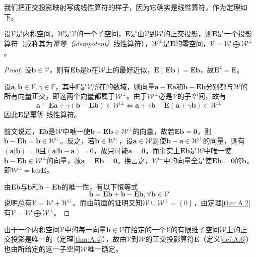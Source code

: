 \documentclass[main.tex]{subfiles}
\begin{document}
我们把正交投影映射写成线性算符的样子，因为它确实是线性算符，作为定理如下。
\begin{theorem}\label{thm:A.5}
    设$\mathcal{V}$是内积空间，$\mathcal{W}$是$\mathcal{V}$的一个子空间，$\mathbf{E}$是由$\mathcal{V}$到$\mathcal{W}$的正交投影，则$\mathbf{E}$是一个投影算符（或称其为\emph{幂等（idempotent）}线性算符），$\mathcal{W}^\perp$是$\mathbf{E}$的零空间，$\mathcal{V}=\mathcal{W}\bigoplus\mathcal{W}^\perp$。
\end{theorem}
\begin{proof}
    设$\mathbf{b}\in\mathcal{V}$，则有$\mathbf{Eb}$是$\mathbf{b}$在$\mathcal{W}$上的最好近似，$\mathbf{E}\left(\mathbf{Eb}\right)=\mathbf{Eb}$，故$\mathbf{E}^2=\mathbf{E}$。

    设$\mathbf{a},\mathbf{b}\in\mathcal{V},\gamma\in\mathbb{F}$，其中$\mathbb{F}$是$\mathcal{V}$所在的数域，则向量$\mathbf{a}-\mathbf{Ea}$和$\mathbf{b}-\mathbf{Eb}$分别都与$\mathcal{W}$的所有向量正交，即这两个向量都属于$\mathcal{W}^\perp$。由于$\mathcal{W}^\perp$必是$\mathcal{V}$的子空间，故有
    \[
        \mathbf{a}-\mathbf{Ea}+\gamma\left(\mathbf{b}-\mathbf{Eb}\right)\in\mathcal{W}^\perp\Leftrightarrow\mathbf{a}+\gamma\mathbf{b}-\mathbf{E}\left(\mathbf{a}+\gamma\mathbf{b}\right)\in\mathcal{W}^\perp
    \]
    因此$\mathbf{E}$是幂等  线性算符。

    前文说过，$\mathbf{Eb}$是$\mathcal{W}$中唯一使$\mathbf{b}-\mathbf{Eb}\in\mathcal{W}^\perp$的向量，故若$\mathbf{Eb}=\mathbf{0}$，则$\mathbf{b}-\mathbf{Eb}=\mathbf{b}\in\mathcal{W}^\perp$。反之，若$\mathbf{b}\in\mathcal{W}^\perp$，设$\mathbf{a}\in\mathcal{W}$是使$\mathbf{b}-\mathbf{a}\in\mathcal{W}^\perp$的向量，则有$\left(\mathbf{a}|\mathbf{b}\right)=0$且$\left(\mathbf{a}|\mathbf{b}-\mathbf{a}\right)=0$，故只可能$\mathbf{a}=\mathbf{0}$。而事实上$\mathbf{Eb}$是$\mathcal{W}$中唯一使$\mathbf{b}-\mathbf{Eb}\in\mathcal{W}^\perp$的向量，故$\mathbf{a}=\mathbf{Eb}=\mathbf{0}$。换言之，$\mathcal{W}^\perp$中的向量全是使$\mathbf{Eb}=\mathbf{0}$的$\mathbf{b}$，即$\mathcal{W}^\perp=\mathrm{ker}\mathbf{E}$。


    由$\mathbf{Eb}$与$\mathbf{b}$和$\mathbf{b}-\mathbf{Eb}$的唯一性，有以下恒等式
    \[\mathbf{b}=\mathbf{Eb}+\mathbf{b}-\mathbf{Eb}, \forall\mathbf{b}\in\mathcal{V}\]
    说明总有$\mathcal{V}=\mathcal{W}+\mathcal{W}^\perp$。而由前面的证明又知$\mathcal{W}\cup\mathcal{W}^\perp=\left\{0\right\}$，由定理\ref{thm:A.2}有$\mathcal{V}=\mathcal{W}\bigoplus\mathcal{W}^\perp$。
\end{proof}

由于一个内积空间$\mathcal{V}$中的每一向量$\mathbf{b}\in\mathcal{V}$在给定的一个$\mathcal{V}$的有限维子空间$\mathcal{W}$上的正交投影是唯一的（定理\ref{thm:A.4}），故由$\mathcal{V}$到$\mathcal{W}$的正交投影算符$\mathbf{E}$（定义\ref{def:A.6}）也由所给定的这一子空间$\mathcal{W}$唯一确定。
\end{document}
